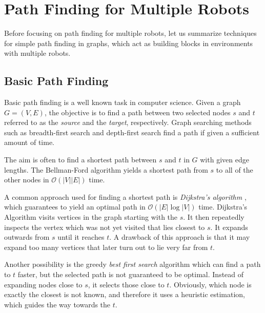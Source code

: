\chapter{Path Finding for Multiple Robots}\label{chap:app}


Before focusing on path finding for multiple robots, let us summarize techniques for simple path finding in graphs, which act as building blocks in environments with multiple robots.

\section{Basic Path Finding}

Basic path finding is a well known task in computer science.
Given a graph $G=(V,E)$, the objective is to find a path between two selected nodes $s$ and $t$ referred to as the \emph{source} and the \emph{target}, respectively.
Graph searching methods such as breadth-first search and depth-first search find a path if given a sufficient amount of time. 

The aim is often to find a shortest path between $s$ and $t$ in $G$ with given edge lengths.
The Bellman-Ford algorithm yields a shortest path from $s$ to all of the other nodes in $\mathcal{O}(|V||E|)$ time.

A common approach used for finding a shortest path is \emph{Dijkstra's algorithm} \cite{dijkstra59}, which guarantees to yield an optimal path in $\mathcal{O}(|E|\log|V|)$ time.
Dijkstra’s Algorithm visits vertices in the graph starting with the $s$. 
It then repeatedly inspects the vertex which was not yet visited that lies closest to $s$. 
It expands outwards from $s$ until it reaches $t$. 
A drawback of this approach is that it may expand too many vertices that later turn out to lie very far from $t$.

Another possibility is the greedy \emph{best first search} algorithm which can find a path to $t$ faster, but the selected path is not guaranteed to be optimal.
Instead of expanding nodes close to $s$, it selects those close to $t$.
Obviously, which node is exactly the closest is not known, and therefore it uses a heuristic estimation, which guides the way towards the $t$.

